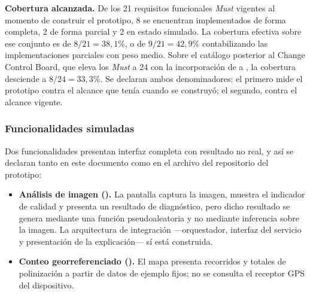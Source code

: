 \noindent
\textbf{Cobertura alcanzada.} De los 21 requisitos funcionales \emph{Must} vigentes al momento de
construir el prototipo, 8 se encuentran implementados de forma completa, 2 de forma parcial y 2 en
estado simulado. La cobertura efectiva sobre ese conjunto es de $8/21 = 38{,}1\%$, o de
$9/21 = 42{,}9\%$ contabilizando las implementaciones parciales con peso medio. Sobre el catálogo
posterior al Change Control Board, que eleva los \emph{Must} a 24 con la incorporación de
 a , la cobertura desciende a $8/24 = 33{,}3\%$. Se declaran ambos
denominadores: el primero mide el prototipo contra el alcance que tenía cuando se construyó; el
segundo, contra el alcance vigente.

\noindent{}

\noindent{}

\subsubsection{Funcionalidades simuladas}

Dos funcionalidades presentan interfaz completa con resultado no real, y así se declaran tanto en
este documento como en el archivo  del repositorio del prototipo:

\begin{itemize}[nosep]
  \item \textbf{Análisis de imagen ().} La pantalla captura la imagen, muestra el
        indicador de calidad y presenta un resultado de diagnóstico, pero dicho resultado se genera
        mediante una función pseudoaleatoria y no mediante inferencia sobre la imagen. La
        arquitectura de integración ---orquestador, interfaz del servicio y presentación de la
        explicación--- sí está construida.
  \item \textbf{Conteo georreferenciado ().} El mapa presenta recorridos y totales de
        polinización a partir de datos de ejemplo fijos; no se consulta el receptor GPS del
        dispositivo.
\end{itemize}


